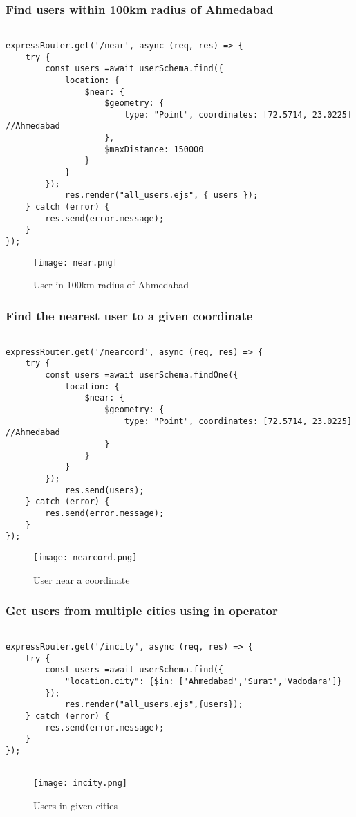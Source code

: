 \documentclass[12pt,a4paper]{article}
\begin{document}
\subsubsection{Find users within 100km radius of Ahmedabad}
\begin{lstlisting}
    
expressRouter.get('/near', async (req, res) => {
    try {
        const users =await userSchema.find({
            location: {
                $near: {
                    $geometry: {
                        type: "Point", coordinates: [72.5714, 23.0225] //Ahmedabad
                    },
                    $maxDistance: 150000
                }
            }
        });
            res.render("all_users.ejs", { users });
    } catch (error) {
        res.send(error.message);
    }
});

\end{lstlisting}
\begin{figure}[H]
    \centering
    \texttt{[image: near.png]}
    \caption{User in 100km radius of Ahmedabad}
    \label{fig:sample}
\end{figure}

\subsubsection{Find the nearest user to a given coordinate}
\begin{lstlisting}
    
expressRouter.get('/nearcord', async (req, res) => {
    try {
        const users =await userSchema.findOne({
            location: {
                $near: {
                    $geometry: {
                        type: "Point", coordinates: [72.5714, 23.0225] //Ahmedabad
                    }
                }
            }
        });
            res.send(users);
    } catch (error) {
        res.send(error.message);
    }
});

\end{lstlisting}
\begin{figure}[H]
    \centering
    \texttt{[image: nearcord.png]}
    \caption{User near a coordinate}
    \label{fig:sample}
\end{figure}


\subsubsection{Get users from multiple cities using in operator}
\begin{lstlisting}
  
expressRouter.get('/incity', async (req, res) => {
    try {
        const users =await userSchema.find({
            "location.city": {$in: ['Ahmedabad','Surat','Vadodara']}
        });
            res.render("all_users.ejs",{users});
    } catch (error) {
        res.send(error.message);
    }
});


\end{lstlisting}
\begin{figure}[H]
    \centering
    \texttt{[image: incity.png]}
    \caption{Users in given cities}
    \label{fig:sample}
\end{figure}
\end{document}
